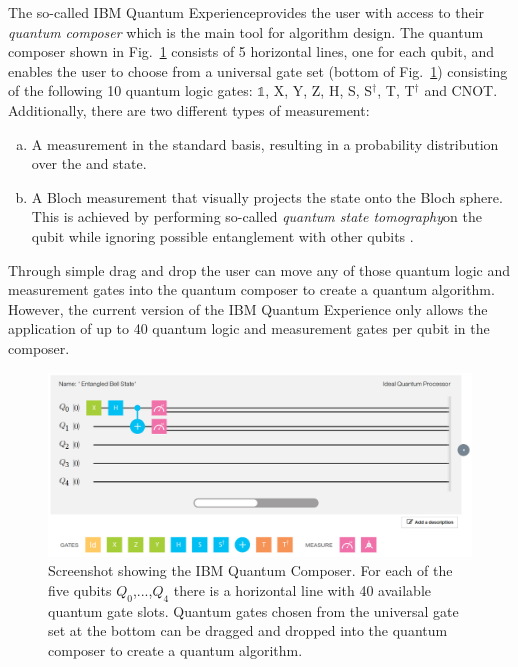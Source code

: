The so-called IBM Quantum Experience\footnotemark[9] provides the user with access to their \emph{quantum composer} which is the main tool for algorithm design. The quantum composer shown in Fig.~\ref{fig:composer} consists of 5 horizontal lines, one for each qubit, and enables the user to choose from a universal gate set (bottom of Fig.~\ref{fig:composer}) consisting of the following 10 quantum logic gates: $\mathbb{1}$, X, Y, Z, H, S, S$^\dagger$, T, T$^\dagger$ and CNOT. Additionally, there are two different types of measurement:
\begin{enumerate}[(a)]
\item A measurement in the standard basis, resulting in a probability distribution over the \0 and \1 state.
\item A Bloch measurement that visually projects the state onto the Bloch sphere. This is achieved by performing so-called \emph{quantum state tomography}\footnotemark[10] on the qubit while ignoring possible entanglement with other qubits \cite{ibmqetomo}.
\end{enumerate}
Through simple drag and drop the user can move any of those quantum logic and measurement gates into the quantum composer to create a quantum algorithm. However, the current version of the IBM Quantum Experience only allows the application of up to 40 quantum logic and measurement gates per qubit in the composer.

\begin{figure}[H]
      \centering
       \includegraphics[scale=0.36]{img/ibmcomposer.png}
       \caption[]{\label{fig:composer} Screenshot showing the IBM Quantum Composer. For each of the five qubits $Q_0$,...,$Q_4$ there is a horizontal line with 40 available quantum gate slots. Quantum gates chosen from the universal gate set at the bottom can be dragged and dropped into the quantum composer to create a quantum algorithm.\footnotemark[11]}
\end{figure}

